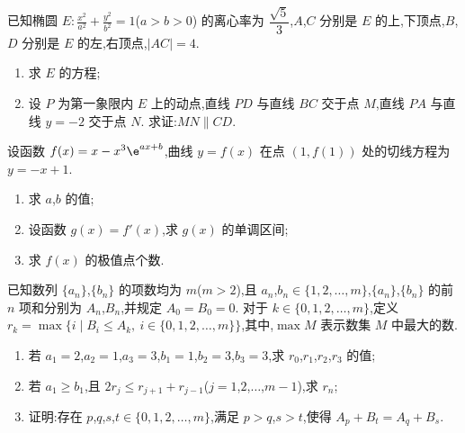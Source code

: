 \begin{problem}
已知椭圆 \(E:\frac{x^2}{a^2}+\frac{y^2}{b^2}=1\)(\(a>b>0\)) 的离心率为 \(\dfrac{\sqrt{5}}{3}\),\(A\),\(C\) 分别是 \(E\) 的上,下顶点,\(B\),\(D\) 分别是 \(E\) 的左,右顶点,\(|AC|=4\).

\begin{enumerate}
\item 求 \(E\) 的方程;
\item 设 \(P\) 为第一象限内 \(E\) 上的动点,直线 \(PD\) 与直线 \(BC\) 交于点 \(M\),直线 \(PA\) 与直线 \(y=-2\) 交于点 \(N\). 求证:\(MN\parallel CD\).
\end{enumerate}
\end{problem}

\begin{problem}
设函数 \(f(x)=x-x^3\e^{ax+b}\),曲线 \(y=f(x)\) 在点 \((1,f(1))\) 处的切线方程为 \(y=-x+1\).

\begin{enumerate}
\item 求 \(a\),\(b\) 的值;
\item 设函数 \(g(x)=f'(x)\),求 \(g(x)\) 的单调区间;
\item 求 \(f(x)\) 的极值点个数.
\end{enumerate}
\end{problem}

\begin{problem}
已知数列 \(\{a_n\}\),\(\{b_n\}\) 的项数均为 \(m\)(\(m>2\)),且 \(a_n\),\(b_n\in\{1,2,\dots,m\}\),\(\{a_n\}\),\(\{b_n\}\) 的前 \(n\) 项和分别为 \(A_n\),\(B_n\),并规定 \(A_0=B_0=0\). 对于 \(k\in\{0,1,2,\dots,m\}\),定义 \(r_k=\max \{ i\mid B_i\le A_k,\ i\in\{0,1,2,\dots,m\}\}\),其中,\(\max M\) 表示数集 \(M\) 中最大的数.

\begin{enumerate}
\item 若 \(a_1=2\),\(a_2=1\),\(a_3=3\),\(b_1=1\),\(b_2=3\),\(b_3=3\),求 \(r_0\),\(r_1\),\(r_2\),\(r_3\) 的值;
\item 若 \(a_1\ge b_1\),且 \(2r_j\le r_{j+1}+r_{j-1}\)(\(j=1\),\(2\),\(\dots\),\(m-1\)),求 \(r_n\);
\item 证明:存在 \(p\),\(q\),\(s\),\(t\in\{0,1,2,\dots,m\}\),满足 \(p>q\),\(s>t\),使得 \(A_p+B_t=A_q+B_s\).
\end{enumerate}
\end{problem}

